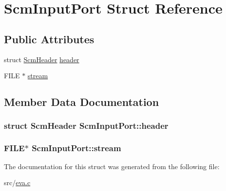 \hypertarget{struct_scm_input_port}{\section{Scm\-Input\-Port Struct Reference}
\label{struct_scm_input_port}
}
\subsection*{Public Attributes}
\begin{DoxyCompactItemize}
\item 
struct \hyperlink{struct_scm_header}{Scm\-Header} \hyperlink{struct_scm_input_port_a77c7ccc24ddc2f60259a403fdc49dff8}{header}
\item 
F\-I\-L\-E $\ast$ \hyperlink{struct_scm_input_port_af0d7cae444d9acc6d17ca2558ea76e4f}{stream}
\end{DoxyCompactItemize}


\subsection{Member Data Documentation}
\hypertarget{struct_scm_input_port_a77c7ccc24ddc2f60259a403fdc49dff8}{
\subsubsection[{header}]{\setlength{\rightskip}{0pt plus 5cm}struct {\bf Scm\-Header} Scm\-Input\-Port\-::header}}\label{struct_scm_input_port_a77c7ccc24ddc2f60259a403fdc49dff8}
\hypertarget{struct_scm_input_port_af0d7cae444d9acc6d17ca2558ea76e4f}{
\subsubsection[{stream}]{\setlength{\rightskip}{0pt plus 5cm}F\-I\-L\-E$\ast$ Scm\-Input\-Port\-::stream}}\label{struct_scm_input_port_af0d7cae444d9acc6d17ca2558ea76e4f}


The documentation for this struct was generated from the following file\-:\begin{DoxyCompactItemize}
\item 
src/\hyperlink{eva_8c}{eva.\-c}\end{DoxyCompactItemize}
